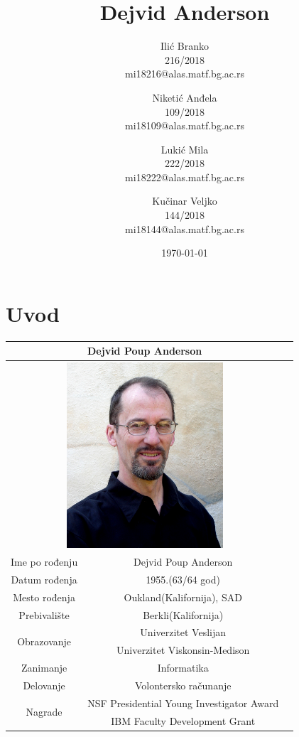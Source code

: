 \documentclass[titlepage, 12pt]{article}
\begin{document}
\title{Dejvid Anderson}
\author{Ilić Branko \\ 216/2018 \\mi18216@alas.matf.bg.ac.rs \and  Niketić Anđela \\ 109/2018 \\ mi18109@alas.matf.bg.ac.rs\and Lukić Mila \\ 222/2018 \\mi18222@alas.matf.bg.ac.rs\and Kučinar Veljko \\ 144/2018 \\ mi18144@alas.matf.bg.ac.rs}
\date{\today}

\maketitle
\tableofcontents
\section{Uvod}

\begin{tabular}{|c|c|c|}
\hline
\multicolumn{2}{|c|}{Dejvid Poup Anderson}\\
\hline
\multicolumn{2}{|c|}{\includegraphics[width=220px,height=261px]{dejvid.jpg}}\\

\hline
Ime po rođenju & Dejvid Poup Anderson \\
\hline
Datum rođenja & 1955.(63/64 god)\\
\hline
Mesto rođenja & Oukland(Kalifornija), SAD\\
\hline
Prebivalište & Berkli(Kalifornija)\\
\hline
\multirow{2}{*}{Obrazovanje}&Univerzitet Veslijan\\
&Univerzitet Viskonsin-Medison\\
\hline 
Zanimanje & Informatika\\
\hline
Delovanje & Volontersko računanje \\
\hline
\multirow{2}{*}{Nagrade}&NSF Presidential Young Investigator Award\\
&IBM Faculty Development Grant
\\
\hline
\end{tabular}
\\
\\
\newline
\end{document}
